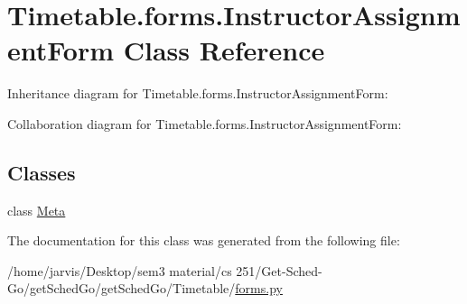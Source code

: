 \hypertarget{classTimetable_1_1forms_1_1InstructorAssignmentForm}{}\section{Timetable.\+forms.\+Instructor\+Assignment\+Form Class Reference}
\label{classTimetable_1_1forms_1_1InstructorAssignmentForm}


Inheritance diagram for Timetable.\+forms.\+Instructor\+Assignment\+Form\+:


Collaboration diagram for Timetable.\+forms.\+Instructor\+Assignment\+Form\+:
\subsection*{Classes}
\begin{DoxyCompactItemize}
\item 
class \hyperlink{classTimetable_1_1forms_1_1InstructorAssignmentForm_1_1Meta}{Meta}
\end{DoxyCompactItemize}


The documentation for this class was generated from the following file\+:\begin{DoxyCompactItemize}
\item 
/home/jarvis/\+Desktop/sem3 material/cs 251/\+Get-\/\+Sched-\/\+Go/get\+Sched\+Go/get\+Sched\+Go/\+Timetable/\hyperlink{Timetable_2forms_8py}{forms.\+py}\end{DoxyCompactItemize}

